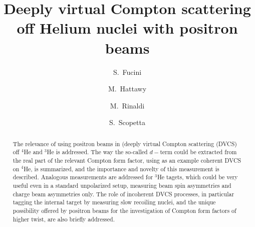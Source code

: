 \documentclass[times, twoside]{PosWhiPap}
\begin{document}
\title{Deeply virtual Compton scattering off Helium nuclei with positron beams}

\author[1]{S.~Fucini}
\author[2]{M.~Hattawy}
\author[1]{M.~Rinaldi}
\author[1]{S.~Scopetta}





\maketitle

\begin{abstract}
The relevance of using positron beams in (deeply virtual Compton scattering (DVCS) off $^4$He and $^3$He 
   is addressed. The way the so-called $d-$term could be extracted from the 
   real part of the relevant Compton form factor, using as an example coherent 
   DVCS on $^4$He, is summarized, and the importance and novelty of this measurement is described. Analogous measurements are addressed for $^3$He tagets,
   which could be very useful even in a standard unpolarized setup, measuring beam spin asymmetries and charge beam asymmetries only.
   The role of incoherent  
   DVCS processes, in particular tagging the internal target by measuring slow recoiling nuclei,  and the unique possibility offered by positron beams for the 
   investigation of Compton form factors of higher twist, are also  briefly 
   addressed.
\end {abstract}


\end{document}
